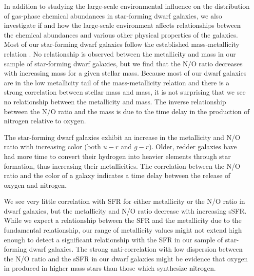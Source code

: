 In addition to studying the large-scale environmental influence on the 
distribution of gas-phase chemical abundances in star-forming dwarf galaxies, we 
also investigate if and how the large-scale environment affects relationships 
between the chemical abundances and various other physical properties of the 
galaxies.  Most of our star-forming dwarf galaxies follow the established 
mass-metallicity relation \citep[e.g.,][]{Tremonti04}.  No relationship is 
observed between the metallicity and  mass in our sample of 
star-forming dwarf galaxies, but we find that the N/O ratio decreases with 
increasing  mass for a given stellar mass.  Because most of our dwarf 
galaxies are in the low metallicity tail of the mass-metallicity relation and 
there is a strong correlation between stellar mass and  mass, it is 
not surprising that we see no relationship between the metallicity and 
 mass.  The inverse relationship between the N/O ratio and the 
 mass is due to the time delay in the production of nitrogen relative 
to oxygen.

The star-forming dwarf galaxies exhibit an increase in the metallicity and N/O 
ratio with increasing color (both $u-r$ and $g-r$).  Older, redder galaxies have 
had more time to convert their hydrogen into heavier elements through star 
formation, thus increasing their metallicities.  The correlation between the N/O 
ratio and the color of a galaxy indicates a time delay between the release of 
oxygen and nitrogen.

We see very little correlation with SFR for either metallicity or the N/O ratio 
in dwarf galaxies, but the metallicity and N/O ratio decrease with increasing 
sSFR.  While we expect a relationship between the SFR and the metallicity due to 
the fundamental relationship, our range of metallicity values might not extend 
high enough to detect a significant relationship with the SFR in our sample of 
star-forming dwarf galaxies.  The strong anti-correlation with low dispersion 
between the N/O ratio and the sSFR in our dwarf galaxies might be evidence that 
oxygen in produced in higher mass stars than those which synthesize nitrogen.


